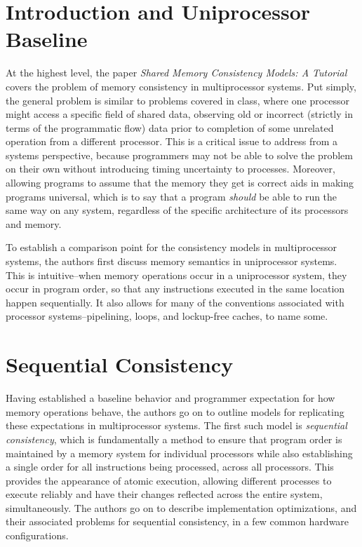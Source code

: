 \documentclass{article}
\begin{document}
  
  \graphicspath{{./images/}}

\section{Introduction and Uniprocessor Baseline}

\par At the highest level, the paper \textit{Shared Memory Consistency Models: A Tutorial} covers the problem of memory consistency in multiprocessor systems.
Put simply, the general problem is similar to problems covered in class, where one processor might access a specific field of shared data, observing old or incorrect (strictly in terms of the programmatic flow) data prior to completion of some unrelated operation from a different processor.
This is a critical issue to address from a systems perspective, because programmers may not be able to solve the problem on their own without introducing timing uncertainty to processes.
Moreover, allowing programs to assume that the memory they get is correct aids in making programs universal, which is to say that a program \textit{should} be able to run the same way on any system, regardless of the specific architecture of its processors and memory.

\par To establish a comparison point for the consistency models in multiprocessor systems, the authors first discuss memory semantics in uniprocessor systems.
This is intuitive--when memory operations occur in a uniprocessor system, they occur in program order, so that any instructions executed in the same location happen sequentially.
It also allows for many of the conventions associated with processor systems--pipelining, loops, and lockup-free caches, to name some.

\section{Sequential Consistency}

\par Having established a baseline behavior and programmer expectation for how memory operations behave, the authors go on to outline models for replicating these expectations in multiprocessor systems.
The first such model is \textit{sequential consistency}, which is fundamentally a method to ensure that program order is maintained by a memory system for individual processors while also establishing a single order for all instructions being processed, across all processors.
This provides the appearance of atomic execution, allowing different processes to execute reliably and have their changes reflected across the entire system, simultaneously. The authors go on to describe implementation optimizations, and their associated problems for sequential consistency, in a few common hardware configurations. 
\end{document}
